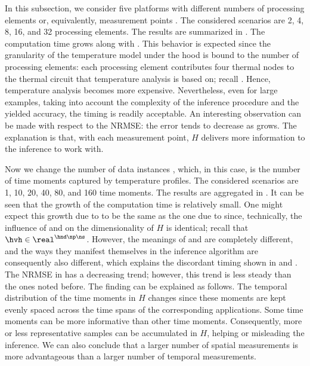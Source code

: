 
In this subsection, we consider five platforms with different numbers of
processing elements or, equivalently, measurement points \np. The considered
scenarios are 2, 4, 8, 16, and 32 processing elements. The results are
summarized in . The computation time grows along with \np.
This behavior is expected since the granularity of the temperature model under
the hood is bound to the number of processing elements: each processing element
contributes four thermal nodes to the thermal  circuit that temperature
analysis is based on; recall . Hence, temperature
analysis becomes more expensive. Nevertheless, even for large examples, taking
into account the complexity of the inference procedure and the yielded accuracy,
the timing is readily acceptable. An interesting observation can be made with
respect to the \ac{NRMSE}: the error tends to decrease as \np grows. The
explanation is that, with each measurement point, $H$ delivers more information
to the inference to work with.


Now we change the number of data instances \ns, which, in this case, is the
number of time moments captured by temperature profiles. The considered
scenarios are 1, 10, 20, 40, 80, and 160 time moments. The results are
aggregated in . It can be seen that the growth of the
computation time is relatively small. One might expect this growth due to \ns to
be the same as the one due to \np since, technically, the influence of \np and
\ns on the dimensionality of $H$ is identical; recall that $\hvh \in \real^{\hnd
\np \ns}$. However, the meanings of \np and \ns are completely different, and
the ways they manifest themselves in the inference algorithm are consequently
also different, which explains the discordant timing shown in
 and . The \ac{NRMSE} in
 has a decreasing trend; however, this trend is less
steady than the ones noted before. The finding can be explained as follows. The
temporal distribution of the time moments in $H$ changes since these moments are
kept evenly spaced across the time spans of the corresponding applications. Some
time moments can be more informative than other time moments. Consequently, more
or less representative samples can be accumulated in $H$, helping or misleading
the inference. We can also conclude that a larger number of spatial measurements
is more advantageous than a larger number of temporal measurements.

